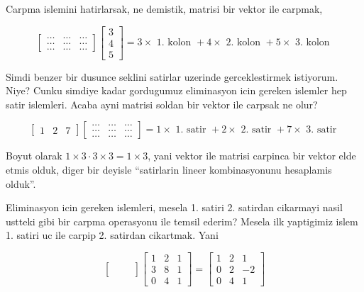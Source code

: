 \documentclass[12pt,fleqn]{article}\usepackage{../common}
\begin{document}
Carpma islemini hatirlarsak, ne demistik, matrisi bir vektor ile carpmak,


$$ 
\left[\begin{array}{rrr}
    \dots & \dots & \dots \\
    \dots &  \dots & \dots \\
    \dots & \dots &  \dots
  \end{array}\right]
\left[\begin{array}{r}
3 \\
4 \\
5
\end{array}\right] = 
3 \times \textrm{ 1. kolon } + 4  \times \textrm{ 2. kolon } + 
5  \times \textrm{ 3. kolon } 
$$

Simdi benzer bir dusunce seklini satirlar uzerinde gerceklestirmek
istiyorum. Niye? Cunku simdiye kadar gordugumuz eliminasyon icin gereken
islemler hep satir islemleri. Acaba ayni matrisi soldan bir vektor ile
carpsak ne olur? 

$$ 
\left[\begin{array}{rrr}
1 & 2 & 7
\end{array}\right]
\left[\begin{array}{rrr}
    \dots & \dots & \dots \\
    \dots &  \dots & \dots \\
    \dots & \dots &  \dots
  \end{array}\right]
 = 
1 \times \textrm{ 1. satir } + 2  \times \textrm{ 2. satir } + 
7  \times \textrm{ 3. satir } 
$$

Boyut olarak $1 \times 3 \cdot 3 \times 3 = 1 \times 3$, yani vektor ile
matrisi carpinca bir vektor elde etmis olduk, diger bir deyisle
``satirlarin lineer kombinasyonunu hesaplamis olduk''.

Eliminasyon icin gereken islemleri, mesela 1. satiri 2. satirdan cikarmayi
nasil ustteki gibi bir carpma operasyonu ile temsil ederim? Mesela ilk
yaptigimiz islem 1. satiri uc ile carpip 2. satirdan cikartmak. Yani

$$ 
\left[\begin{array}{rrr}
 &  &  \\
 &  &  \\
 &  & 
\end{array}\right]
\left[\begin{array}{rrr}
1 & 2 & 1 \\
3 & 8 & 1 \\
0 & 4 & 1
\end{array}\right] =
\left[\begin{array}{rrr}
    1 & 2 & 1 \\
    0 & 2 & -2 \\
    0 & 4 & 1
  \end{array}\right]
 $$
\end{document}
